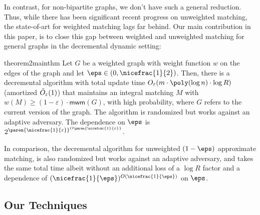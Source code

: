 In contrast, for non-bipartite graphs, we don’t have such a general reduction. Thus, while there has been significant recent progress on unweighted matching, the state-of-art for weighted matching lags far behind. Our main contribution in this paper, is to close this gap between weighted and unweighted matching for general graphs in the decremental dynamic setting:



\begin{restatable}{theorem2}{mainthm}\label{thm:main}
Let $G$ be a weighted graph with weight function $w$ on the edges of the graph and let $\eps\in (0,\nicefrac{1}{2})$. Then, there is a decremental algorithm with total update time $O_{\varepsilon}(m\cdot\poly(\log n)\cdot\log R)$ (amortized $\Tilde{O}_{\varepsilon}(1)$) that maintains an integral matching $M$ with $w(M)\geqslant (1-\varepsilon)\cdot \textsf{mwm}(G)$, with high probability, where $G$ refers to the current version of the graph. The algorithm is randomized but works against an adaptive adversary. The dependence on $\eps$ is $2^{{\paren{\nicefrac{1}{\varepsilon}}}^{O\paren{\nicefrac{1}{\varepsilon}}}}$.
\end{restatable}

In comparison, the decremental algorithm for unweighted $(1-\eps)$ approximate matching, is also randomized but works against an adaptive adversary, and takes the same total time albeit without an additional loss of a $\log R$ factor and a dependence of $(\nicefrac{1}{\eps})^{O(\nicefrac{1}{\eps})}$ on $\eps$. 


\subsection{Our Techniques}

